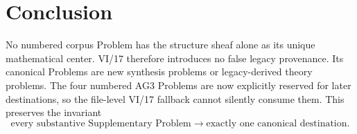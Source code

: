 \section*{Conclusion}
No numbered corpus Problem has the structure sheaf alone as its unique mathematical center.
VI/17 therefore introduces no false legacy provenance.  Its canonical Problems are new
synthesis problems or legacy-derived theory problems.  The four numbered AG3 Problems are
now explicitly reserved for later destinations, so the file-level VI/17 fallback cannot
silently consume them.  This preserves the invariant
\[
\boxed{\text{every substantive Supplementary Problem}\longrightarrow\text{exactly one canonical destination}.}
\]
